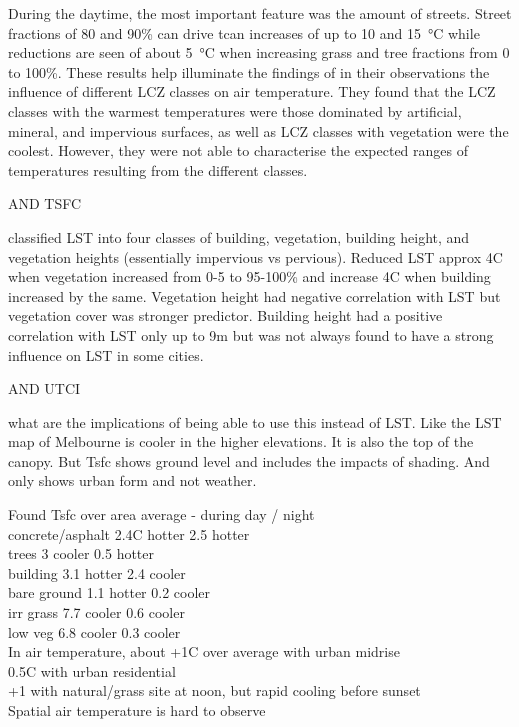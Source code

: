 \documentclass[final,3p,times,authoryear]{elsarticle}
\begin{document}
During the daytime, the most important feature was the amount of streets. Street fractions of 80 and 90\% can drive \gls{tcan} increases of up to 10 and 15\SI{}{\degreeCelsius} while reductions are seen of about 5\SI{}{\degreeCelsius} when increasing grass and tree fractions from 0 to 100\%. These results help illuminate the findings of \cite{Emery2021} in their observations the influence of different LCZ classes on air temperature. They found that the LCZ classes with the warmest temperatures were those dominated by artificial, mineral, and impervious surfaces, as well as LCZ classes with vegetation were the coolest. However, they were not able to characterise the expected ranges of temperatures resulting from the different classes.


AND TSFC

\cite{Alexander2021} classified LST into four classes of building, vegetation, building height, and vegetation heights (essentially impervious vs pervious). Reduced LST approx 4C when vegetation increased from 0-5 to 95-100\% and increase 4C when building increased by the same. Vegetation height had negative correlation with LST but vegetation cover was stronger predictor. Building height had a positive correlation with LST only up to 9m but was not always found to have a strong influence on LST in some cities.

AND UTCI



what are the implications of being able to use this instead of LST. Like the LST map of Melbourne is cooler in the higher elevations. It is also the top of the canopy. But Tsfc shows ground level and includes the impacts of shading. And only shows urban form and not weather.

\cite{Broadbent2017a}
Found Tsfc over area average - during day / night\\
    concrete/asphalt 2.4C hotter  2.5 hotter\\
    trees 3 cooler  0.5 hotter\\
    building 3.1 hotter  2.4 cooler\\
    bare ground 1.1 hotter  0.2 cooler\\
    irr grass 7.7 cooler 0.6 cooler\\
    low veg 6.8 cooler 0.3 cooler\\
In air temperature, about +1C over average with urban midrise\\
                          0.5C with urban residential\\
                          +1 with natural/grass site at noon, but rapid cooling before sunset\\
    Spatial air temperature is hard to observe\\
\end{document}
